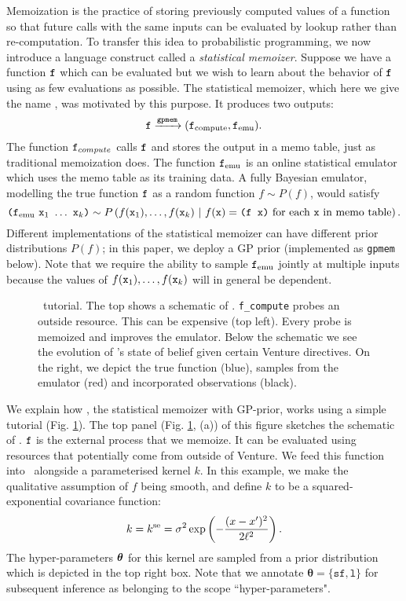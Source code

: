 Memoization is the practice of storing previously computed values of a function so that future calls with the same inputs can be evaluated by lookup rather than re-computation.
To transfer this idea to probabilistic programming, we now introduce a language construct called a
\emph{statistical memoizer}.  Suppose we have a function $\texttt{f}$ which can be evaluated 
but we wish to learn about the behavior of $\texttt{f}$ using as
few evaluations as possible.  The statistical memoizer, which here we give the
name \gpmem, was motivated by this purpose.  It produces two outputs:
\[ \texttt{f} \xrightarrow{\texttt{gpmem}} (\texttt{f}_{\text{compute}}, \texttt{f}_{\textrm{emu}}). \]
The function $\texttt{f}_{compute}$ calls $\texttt{f}$ and stores the output in a memo
table, just as traditional memoization does.  The function $\texttt{f}_{\textrm{emu}}$ is
an online statistical emulator which uses the memo table as its training
data.  A fully Bayesian emulator, modelling the true function $\texttt{f}$ as a
random function $f \sim P(f)$, would satisfy
\[
\texttt{(}\ftt_\emu\ \xtt_1\ \ldots\ \xtt_k\texttt{)}
\sim
P\pn{
  f(\xtt_1), \ldots, f(\xtt_k)
  \mvert
  \text{$f(\xtt) = \texttt{(f x)}$ for each $\xtt$ in memo table}
}.
\]
Different implementations of the statistical memoizer can have
different prior distributions $P(f)$; in this paper, we deploy a \ac{GP} 
prior (implemented as \texttt{gpmem} below).  Note that we require the ability
to sample $\texttt{f}_{\textrm{emu}}$ jointly at multiple inputs because the values of
$f(\texttt{x}_1),\ldots,f(\texttt{x}_k)$ will in general be dependent.


\begin{figure}
\noindent
\captionsetup{aboveskip=-3pt}
\caption{\footnotesize \gpmem\ tutorial. The top shows a schematic of \gpmem.
  \texttt{f\_compute} probes an outside resource.
  This can be expensive (top left).
  Every probe is memoized and improves the emulator. Below the schematic we see the evolution
  of \gpmem's state of belief given certain Venture
  directives. On the right, we depict the true function (blue), samples from the
emulator (red) and incorporated observations (black).}
\label{fig:gpmem_tutorial}
\end{figure}

We explain how \gpmem, the statistical memoizer with \ac{GP}-prior, works using a simple tutorial
(Fig. \ref{fig:gpmem_tutorial}). 
The top panel (Fig. \ref{fig:gpmem_tutorial}, (a)) of this figure sketches the schematic of \gpmem.
$\texttt{f}$ is the external process that we memoize. It can be evaluated using resources that potentially come
from outside of Venture.  
We feed this function into \gpmem\ alongside
a parameterised kernel $k$.  
In this example, we make the qualitative assumption of $f$ being smooth, and define
$k$ to be a squared-exponential covariance function:
\[
k = k^\text{se} = \sigma^2 \exp \left(-\frac{(x-x^\prime)^2}{2\ell^2} \right).
\]
The hyper-parameters $\bm{\theta}$ for this kernel are sampled from a 
prior distribution which is depicted in the top right box.
Note that we annotate $\bm{\theta}=\{\texttt{sf},\texttt{l}\}$ for subsequent
inference as belonging to the scope ``hyper-parameters".

